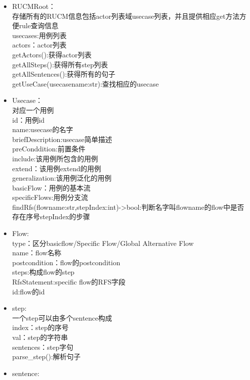    	\begin{itemize}
   		\item 	RUCMRoot：\\
   		存储所有的RUCM信息包括actor列表域usecase列表，并且提供相应get方法方便rule查询信息\\
   		usecases:用例列表\\
   		actors：actor列表\\
   		getActors():获得actor列表\\
   		getAllSteps():获得所有step列表\\
   		getAllSentences():获得所有的句子\\
   		getUseCase(usecasename:str):查找相应的usecase
   		\item 	Usecase：\\
   		对应一个用例\\
   		id：用例id\\
   		name:usecase的名字\\
   		briefDescription:usecase简单描述\\
   		preConddition:前置条件\\
   		include:该用例所包含的用例\\
   		extend：该用例extend的用例\\
   		generalization:该用例泛化的用例\\
   		basicFlow：用例的基本流\\
   		specificFlows:用例分支流\\
   		findRfs(flowname:str,stepIndex:int)->bool:判断名字叫flowname的flow中是否存在序号stepIndex的步骤
   		\item 	Flow:\\
   		type：区分basicflow/Specific Flow/Global Alternative Flow\\
   		name：flow名称\\
   		postcondition：flow的postcondition\\
   		steps:构成flow的step\\
   		RfsStatement:specific flow的RFS字段\\
   		id:flow的id
   		\item 	step:\\
   		一个step可以由多个sentence构成\\
   		index：step的序号\\
   		val：step的字符串\\
   		sentences：step字句\\
   		parse\_step():解析句子
   		\item 	sentence:\\

\end{itemize}
